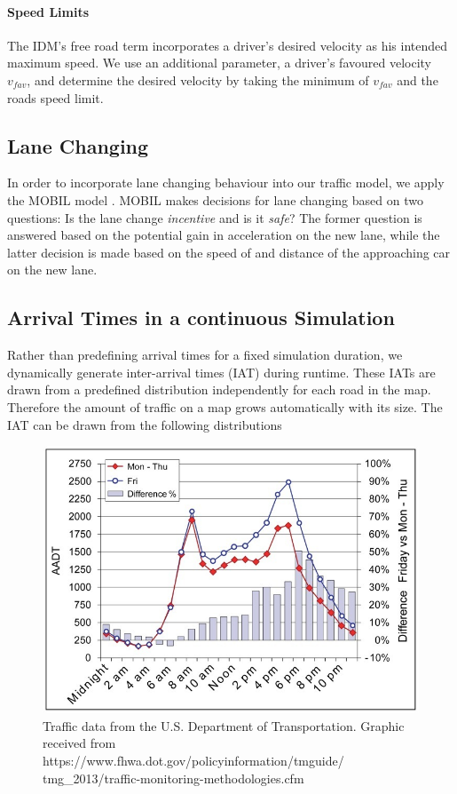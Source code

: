 \documentclass[10pt]{article}
\begin{document}
\paragraph{Speed Limits} The IDM's free road term incorporates a driver's desired velocity as his intended maximum speed. We use an additional parameter, a driver's favoured velocity $v_{fav}$, and determine the desired velocity by taking the minimum of $v_{fav}$ and the roads speed limit.

\subsection{Lane Changing}
In order to incorporate lane changing behaviour into our traffic model, we apply the MOBIL model \citep{treiber2002realistische, kesting2007general}. MOBIL makes decisions for lane changing based on two questions: Is the lane change \textit{incentive} and is it \textit{safe}? The former question is answered based on the potential gain in acceleration on the new lane, while the latter decision is made based on the speed of and distance of the approaching car on the new lane.

\subsection{Arrival Times in a continuous Simulation}
Rather than predefining arrival times for a fixed simulation duration, we dynamically generate inter-arrival times (IAT) during runtime. These IATs are drawn from a predefined distribution independently for each road in the map. Therefore the amount of traffic on a map grows automatically with its size. The IAT can be drawn from the following distributions

\begin{figure}[t]
	\includegraphics[width=\linewidth]{img/traffic-data.jpeg}
	\caption{Traffic data from the U.S. Department of Transportation. Graphic received from https://www.fhwa.dot.gov/policyinformation/tmguide/
	tmg\_2013/traffic-monitoring-methodologies.cfm \label{fig:traffic-data}}
\end{figure} 
 
\end{document}
